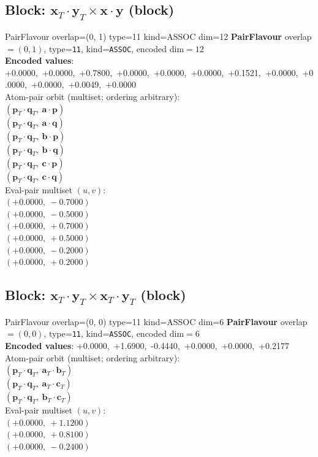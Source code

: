 \documentclass[a4paper,11pt]{article}
\newcommand{\pdcegfomjfhook}[2]{\mathbf{#1} \cdot \mathbf{#2}}
\newcommand{\fpbeomcfokjooi}[2]{\mathbf{#1}_T \cdot \mathbf{#2}_T}
\begin{document}
\subsection{Block: $\fpbeomcfokjooi{x}{y} \times \pdcegfomjfhook{x}{y}$  (block)}
    PairFlavour  overlap=(0, 1)  type=11  kind=ASSOC  dim=12
\textbf{PairFlavour} overlap$=(0, 1)$, type=\texttt{11}, kind=\texttt{ASSOC}, encoded dim$=12$\\
\textbf{      Encoded values}: +0.0000,\ +0.0000,\ +0.7800,\ +0.0000,\ +0.0000,\ +0.0000,\ +0.1521,\ +0.0000,\ +0.0000,\ +0.0000,\ +0.0049,\ +0.0000\\
\quad Atom-pair orbit (multiset; ordering arbitrary):\\
$(\fpbeomcfokjooi{p}{q},\ \pdcegfomjfhook{a}{p})$\\
$(\fpbeomcfokjooi{p}{q},\ \pdcegfomjfhook{a}{q})$\\
$(\fpbeomcfokjooi{p}{q},\ \pdcegfomjfhook{b}{p})$\\
$(\fpbeomcfokjooi{p}{q},\ \pdcegfomjfhook{b}{q})$\\
$(\fpbeomcfokjooi{p}{q},\ \pdcegfomjfhook{c}{p})$\\
$(\fpbeomcfokjooi{p}{q},\ \pdcegfomjfhook{c}{q})$\\
\quad Eval-pair multiset $(u, v)$:\\
$(+0.0000,\ -0.7000)$\\
$(+0.0000,\ -0.5000)$\\
$(+0.0000,\ +0.7000)$\\
$(+0.0000,\ +0.5000)$\\
$(+0.0000,\ -0.2000)$\\
$(+0.0000,\ +0.2000)$\\

\subsection{Block: $\fpbeomcfokjooi{x}{y} \times \fpbeomcfokjooi{x}{y}$  (block)}
    PairFlavour  overlap=(0, 0)  type=11  kind=ASSOC  dim=6
\textbf{PairFlavour} overlap$=(0, 0)$, type=\texttt{11}, kind=\texttt{ASSOC}, encoded dim$=6$\\
\textbf{      Encoded values}: +0.0000,\ +1.6900,\ -0.4440,\ +0.0000,\ +0.0000,\ +0.2177\\
\quad Atom-pair orbit (multiset; ordering arbitrary):\\
$(\fpbeomcfokjooi{p}{q},\ \fpbeomcfokjooi{a}{b})$\\
$(\fpbeomcfokjooi{p}{q},\ \fpbeomcfokjooi{a}{c})$\\
$(\fpbeomcfokjooi{p}{q},\ \fpbeomcfokjooi{b}{c})$\\
\quad Eval-pair multiset $(u, v)$:\\
$(+0.0000,\ +1.1200)$\\
$(+0.0000,\ +0.8100)$\\
$(+0.0000,\ -0.2400)$\\
\end{document}
